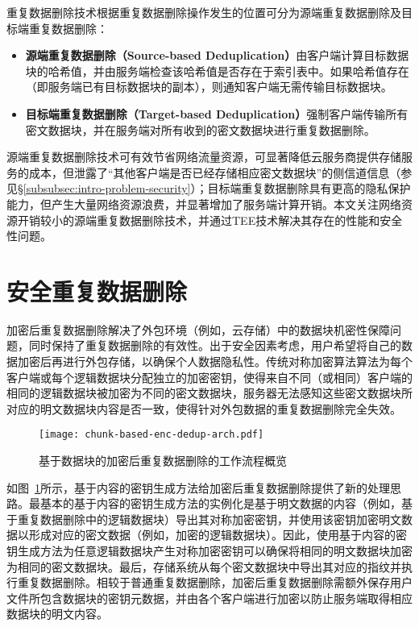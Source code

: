 重复数据删除技术根据重复数据删除操作发生的位置可分为源端重复数据删除及目标端重复数据删除\cite{IDC2010Data}：

\begin{itemize}[leftmargin=*]
    \item \textbf{源端重复数据删除（Source-based Deduplication）}由客户端计算目标数据块的哈希值，并由服务端检查该哈希值是否存在于索引表中。如果哈希值存在（即服务端已有目标数据块的副本），则通知客户端无需传输目标数据块。
    \item \textbf{目标端重复数据删除（Target-based Deduplication）}强制客户端传输所有密文数据块，并在服务端对所有收到的密文数据块进行重复数据删除。
\end{itemize}

源端重复数据删除技术可有效节省网络流量资源，可显著降低云服务商提供存储服务的成本，但泄露了“其他客户端是否已经存储相应密文数据块”的侧信道信息（参见\S\ref{subsubsec:intro-problem-security}）；目标端重复数据删除具有更高的隐私保护能力，但产生大量网络资源浪费，并显著增加了服务端计算开销。本文关注网络资源开销较小的源端重复数据删除技术，并通过TEE技术解决其存在的性能和安全性问题。

\section{安全重复数据删除}
\label{sec:background-enc-deduplication}

加密后重复数据删除解决了外包环境（例如，云存储）中的数据块机密性保障问题，同时保持了重复数据删除的有效性。出于安全因素考虑，用户希望将自己的数据加密后再进行外包存储，以确保个人数据隐私性。传统对称加密算法算法为每个客户端或每个逻辑数据块分配独立的加密密钥，使得来自不同（或相同）客户端的相同的逻辑数据块被加密为不同的密文数据块，服务器无法感知这些密文数据块所对应的明文数据块内容是否一致，使得针对外包数据的重复数据删除完全失效。

\begin{figure}[!htb]
    \small
    \centering
    \texttt{[image: chunk-based-enc-dedup-arch.pdf]}
    \caption{基于数据块的加密后重复数据删除的工作流程概览} 
    \label{fig:chunk-based-enc-dedup-flow}
\end{figure}

如图~\ref{fig:chunk-based-enc-dedup-flow}所示，基于内容的密钥生成方法给加密后重复数据删除提供了新的处理思路。最基本的基于内容的密钥生成方法的实例化是基于明文数据的内容（例如，基于重复数据删除中的逻辑数据块）导出其对称加密密钥，并使用该密钥加密明文数据以形成对应的密文数据（例如，加密的逻辑数据块）。因此，使用基于内容的密钥生成方法为任意逻辑数据块产生对称加密密钥可以确保将相同的明文数据块加密为相同的密文数据块。最后，存储系统从每个密文数据块中导出其对应的指纹并执行重复数据删除。相较于普通重复数据删除，加密后重复数据删除需额外保存用户文件所包含数据块的密钥元数据，并由各个客户端进行加密以防止服务端取得相应数据块的明文内容。

